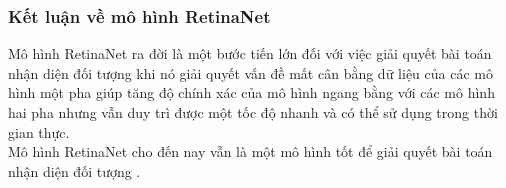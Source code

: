 {    %

    \subsubsection{Kết luận về mô hình RetinaNet}
    Mô hình RetinaNet  ra đời là một bước tiến lớn đối với việc giải quyết bài toán nhận diện đối tượng  khi nó giải quyết vấn đề mất cân bằng dữ liệu  của các mô hình một pha  giúp tăng độ chính xác của mô hình ngang bằng với các mô hình hai pha  nhưng vẫn duy trì được một tốc độ nhanh và có thể sử dụng trong thời gian thực. \\
    Mô hình RetinaNet  cho đến nay vẫn là một mô hình tốt để giải quyết bài toán nhận diện đối tượng .
}
